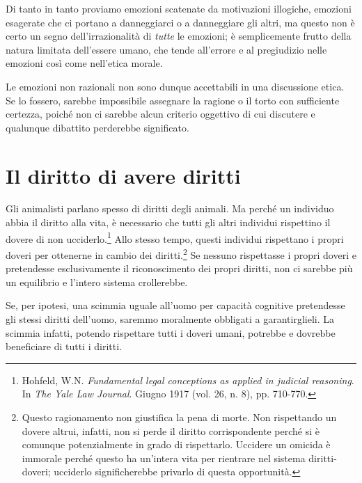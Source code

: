 \documentclass[a4paper,11pt,oneside,article]{memoir}
\begin{document}
Di tanto in tanto proviamo emozioni scatenate da motivazioni illogiche, emozioni
esagerate che ci portano a danneggiarci o a danneggiare gli altri, ma questo non
è certo un segno dell'irrazionalità di \emph{tutte} le emozioni; è semplicemente
frutto della natura limitata dell'essere umano, che tende all'errore e al
pregiudizio nelle emozioni così come nell'etica morale.

Le emozioni non razionali non sono dunque accettabili in una discussione etica.
Se lo fossero, sarebbe impossibile assegnare la ragione o il torto con
sufficiente certezza, poiché non ci sarebbe alcun criterio oggettivo di cui
discutere e qualunque dibattito perderebbe significato.

\chapter{Il diritto di avere diritti}

Gli animalisti parlano spesso di diritti degli animali. Ma perché un individuo
abbia il diritto alla vita, è necessario che tutti gli altri individui
rispettino il dovere di non ucciderlo.\footnote{Hohfeld, W.N. \emph{Fundamental
legal conceptions as applied in judicial reasoning}. In \emph{The Yale Law
Journal}. Giugno 1917 (vol. 26, n. 8), pp. 710-770.} Allo stesso tempo, questi
individui rispettano i propri doveri per ottenerne in cambio dei
diritti.\footnote{Questo ragionamento non giustifica la pena di morte. Non
rispettando un dovere altrui, infatti, non si perde il diritto corrispondente
perché si è comunque potenzialmente in grado di rispettarlo. Uccidere un omicida
è immorale perché questo ha un'intera vita per rientrare nel sistema diritti-
doveri; ucciderlo significherebbe privarlo di questa opportunità.} Se nessuno
rispettasse i propri doveri e pretendesse esclusivamente il riconoscimento dei
propri diritti, non ci sarebbe più un equilibrio e l'intero sistema crollerebbe.

Se, per ipotesi, una scimmia uguale all'uomo per capacità cognitive pretendesse
gli stessi diritti dell'uomo, saremmo moralmente obbligati a garantirglieli. La
scimmia infatti, potendo rispettare tutti i doveri umani, potrebbe e dovrebbe
beneficiare di tutti i diritti.
\end{document}
